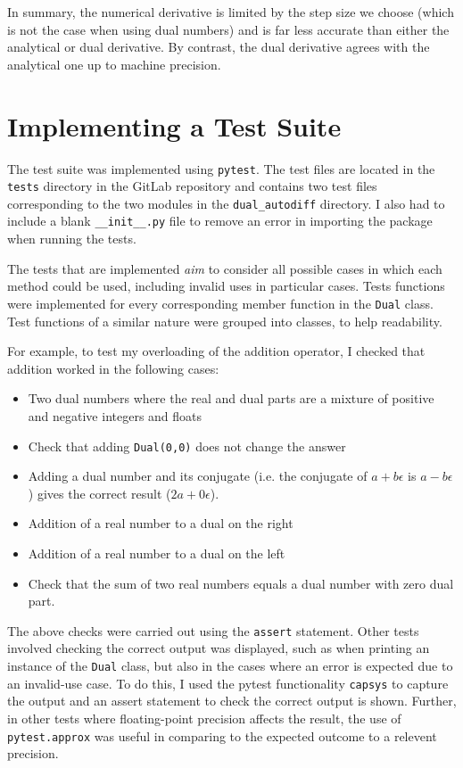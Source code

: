 \documentclass{article}
\begin{document}
In summary, the numerical derivative is limited by the step size we choose (which is not the case when using dual numbers) and is far less accurate than either the analytical or dual derivative. By contrast, the dual derivative agrees with the analytical one up to machine precision. 

    
\section{Implementing a Test Suite} \label{tests}
The test suite was implemented using \texttt{pytest}. The test files are located in the \texttt{tests} directory in the GitLab repository and contains two test files corresponding to the two modules in the \texttt{dual\_autodiff} directory. I also had to include a blank \texttt{\_\_init\_\_.py} file to remove an error in importing the package when running the tests.

The tests that are implemented \textit{aim} to consider all possible cases in which each method could be used, including invalid uses in particular cases. Tests functions were implemented for every corresponding member function in the \texttt{Dual} class. Test functions of a similar nature were grouped into classes, to help readability. 

For example, to test my overloading of the addition operator, I checked that addition worked in the following cases:
\begin{itemize}
    \item Two dual numbers where the real and dual parts are a mixture of positive and negative integers and floats
    \item Check that adding \texttt{Dual(0,0)} does not change the answer
    \item Adding a dual number and its conjugate (i.e. the conjugate of $a+b\epsilon$ is $a-b\epsilon$) gives the correct result  ($2a+0\epsilon$).
    \item Addition of a real number to a dual on the right
    \item Addition of a real number to a dual on the left
    \item Check that the sum of two real numbers equals a dual number with zero dual part.
\end{itemize}

The above checks were carried out using the \texttt{assert} statement. Other tests involved checking the correct output was displayed, such as when printing an instance of the \texttt{Dual} class, but also in the cases where an error is expected due to an invalid-use case. To do this, I used the pytest functionality \texttt{capsys} to capture the output and an assert statement to check the correct output is shown. Further, in other tests where floating-point precision affects the result, the use of \texttt{pytest.approx} was useful in comparing to the expected outcome to a relevent precision. 
\end{document}

